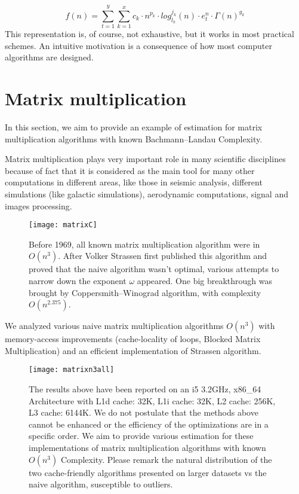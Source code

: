 \[ f(n) =\sum\limits_{t=1}^{y}  \sum\limits_{k=1}^{x} c_{k} \cdot n^{p_{k}} \cdot log_{l_{k}}^{j_{k}}(n) \cdot e_{t}^{n} \cdot  \Gamma(n)^{g_{k}} \]
This representation is, of course, not exhaustive, but it works in most practical schemes. An intuitive motivation is a consequence of how most computer algorithms are designed. \cite{calotoiu2018automatic}



\section{Matrix multiplication}
In this section, we aim to provide an example of estimation for matrix multiplication algorithms with known Bachmann–Landau Complexity.

Matrix multiplication plays very important role in many scientific disciplines because of fact that it is considered as the main tool for many other computations in different areas, like those in seismic analysis, different simulations (like galactic simulations), aerodynamic computations, signal and images processing. \cite{4588528}


\begin{figure}[H]
\centering
\texttt{[image: matrixC]}
\caption{Before 1969, all known matrix multiplication algorithm were in $O(n^3)$. After Volker Strassen first published this algorithm and proved that the naive algorithm wasn't optimal, various attempts to narrow down the exponent $\omega$ appeared. One big breakthrough was brought by Coppersmith–Winograd algorithm, with complexity $O(n^{2.375})$. }
\end{figure}

We analyzed various naive matrix multiplication algorithms $O(n^3)$ with memory-access improvements (cache-locality of loops, Blocked Matrix Multiplication) and an efficient implementation of Strassen algorithm.

\begin{figure}[H]
\centering
\texttt{[image: matrixn3all]}
\caption{The results above have been reported on an i5 3.2GHz, x86\_64 Architecture with L1d cache: 32K, L1i cache: 32K, L2 cache: 256K, L3 cache:  6144K. We do not postulate that the methods above cannot be enhanced
 or the efficiency of the optimizations are in a specific order. We aim to provide various estimation for these implementations of matrix multiplication algorithms with known $O(n^3)$ Complexity. Please remark the natural distribution of the two cache-friendly algorithms presented on larger datasets vs the naive algorithm, susceptible to outliers. }
\end{figure}


